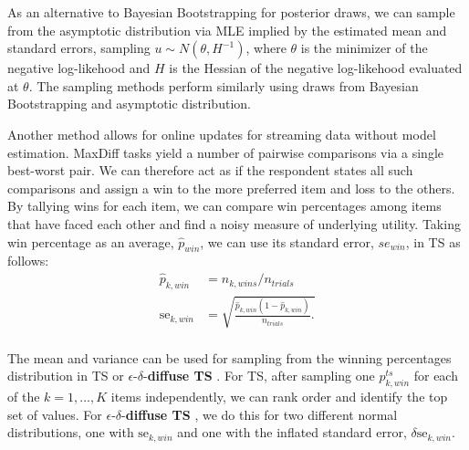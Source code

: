 \documentclass[nonblindrev]{informs3}
\newcommand{\edts}{$\epsilon$-$\delta$-\textbf{diffuse TS} }
\begin{document}
As an alternative to Bayesian Bootstrapping for posterior draws, we can sample from the asymptotic distribution via MLE implied by the estimated mean and standard errors, sampling $u \sim N(\theta,H^{-1})$, where $\theta$ is the minimizer of the negative log-likehood and $H$ is the Hessian of the negative log-likehood evaluated at $\theta$. The sampling methods perform similarly using draws from Bayesian Bootstrapping and asymptotic distribution.

Another method allows for online updates for streaming data without model estimation. MaxDiff tasks yield a number of pairwise comparisons via a single best-worst pair. We can therefore act as if the respondent states all such comparisons and assign a win to the more preferred item and loss to the others. By tallying wins for each item, we can compare win percentages among items that have faced each other and find a noisy measure of underlying utility. Taking win percentage as an average, $\hat{p}_{win}$, we can use its standard error, $se_{win}$, in TS as follows:
\begin{align}
\hat{p}_{k,win} &= n_{k,wins} / n_{trials} \\
\text{se}_{k,win} &= \sqrt{  \frac{ \hat{p}_{k,win} (1-\hat{p}_{k,win}) } {n_{trials}}.  } \\
\end{align}

The mean and variance can be used for sampling from the winning percentages distribution in TS or \edts. For TS, after sampling one $p_{k,win}^{ts}$ for each of the $k=1,\ldots,K$ items independently, we can rank order and identify the top set of values. For \edts, we do this for two different normal distributions, one with $\text{se}_{k,win}$ and one with the inflated standard error, $\delta \text{se}_{k,win}$.
\end{document}
